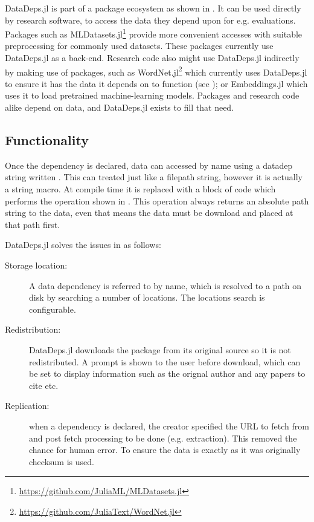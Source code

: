 \documentclass{book}
\begin{document}
DataDeps.jl is part of a package ecosystem as shown in .
It can be used directly by research software, to access the data they depend upon for e.g. evaluations.
Packages such as MLDatasets.jl\footnote{\url{https://github.com/JuliaML/MLDatasets.jl}}
 provide more convenient accesses with suitable preprocessing for commonly used datasets.
These packages currently use DataDeps.jl as a back-end.
Research code also might use DataDeps.jl indirectly by making use of packages, such as WordNet.jl\footnote{\url{https://github.com/JuliaText/WordNet.jl}}
  which currently uses DataDeps.jl to ensure it has the data it depends on to function (see ); 
or Embeddings.jl which uses it to load pretrained machine-learning models.
Packages and research code alike depend on data, and DataDeps.jl exists to fill that need.



\subsection{Functionality}
Once the dependency is declared, data can accessed by name using a datadep string written .
This can treated just like a filepath string, however it is actually a string macro.
At compile time it is replaced with a block of code which performs the operation shown in .
This operation always returns an absolute path string to the data, even that means the data must be download and placed at that path first.


\noindent DataDeps.jl solves the issues in  as follows:
\begin{description}
	\item[Storage location:] A data dependency is referred to by name, which is resolved to a path on disk by searching a number of locations. The locations search is configurable.
	\item[Redistribution:] DataDeps.jl downloads the package from its original source so it is not redistributed. A prompt is shown to the user before download, which can be set to display information such as the orignal author and any papers to cite etc.
	\item[Replication:] when a dependency is declared, the creator specified the URL to fetch from and post fetch processing to be done (e.g. extraction). This removed the chance for human error.
	To ensure the data is exactly as it was originally checksum is used.
\end{description}
\end{document}

